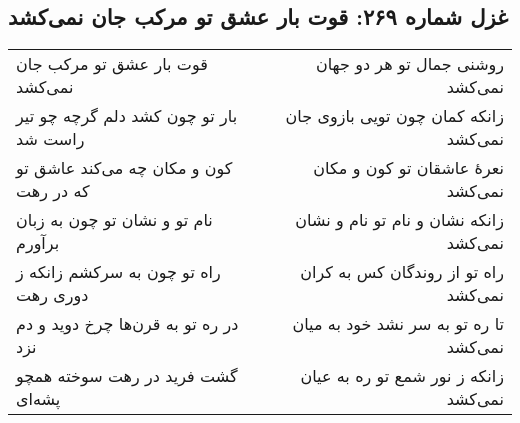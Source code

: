 \begin{center}
\section*{غزل شماره ۲۶۹: قوت بار عشق تو مرکب جان نمی‌کشد}
\label{sec:269}
\begin{longtable}{l p{0.5cm} r}
قوت بار عشق تو مرکب جان نمی‌کشد
&&
روشنی جمال تو هر دو جهان نمی‌کشد
\\
بار تو چون کشد دلم گرچه چو تیر راست شد
&&
زانکه کمان چون تویی بازوی جان نمی‌کشد
\\
کون و مکان چه می‌کند عاشق تو که در رهت
&&
نعرهٔ عاشقان تو کون و مکان نمی‌کشد
\\
نام تو و نشان تو چون به زبان برآورم
&&
زانکه نشان و نام تو نام و نشان نمی‌کشد
\\
راه تو چون به سرکشم زانکه ز دوری رهت
&&
راه تو از روندگان کس به کران نمی‌کشد
\\
در ره تو به قرن‌ها چرخ دوید و دم نزد
&&
تا ره تو به سر نشد خود به میان نمی‌کشد
\\
گشت فرید در رهت سوخته همچو پشه‌ای
&&
زانکه ز نور شمع تو ره به عیان نمی‌کشد
\\
\end{longtable}
\end{center}
